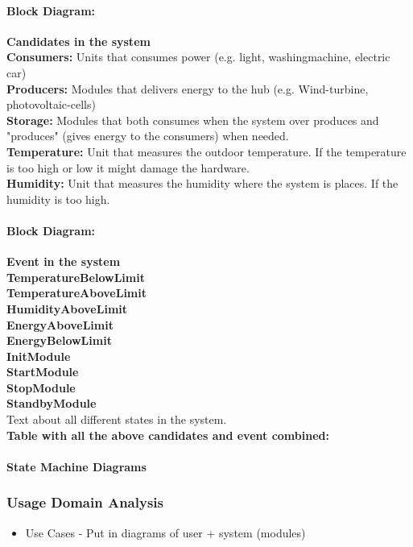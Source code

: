 			\paragraph{Block Diagram:}
				\textbf{Candidates in the system}
				\\\textbf{Consumers:} Units that consumes power (e.g. light, washingmachine, electric car)
				\\\textbf{Producers:} Modules that delivers energy to the hub (e.g. Wind-turbine, photovoltaic-cells)
				\\\textbf{Storage:} Modules that both consumes when the system over produces and "produces" (gives energy to the consumers) when needed. 
				\\\textbf{Temperature:} Unit that measures the outdoor temperature. If the temperature is too high or low it might damage the hardware.
				\\\textbf{Humidity:} Unit that measures the humidity where the system is places. If the humidity is too high.
				\newline
			\paragraph{Block Diagram:}
				\textbf{Event in the system}
				\\\textbf{TemperatureBelowLimit}
				\\\textbf{TemperatureAboveLimit}
				\\\textbf{HumidityAboveLimit}
				\\\textbf{EnergyAboveLimit}
				\\\textbf{EnergyBelowLimit}
				\\\textbf{InitModule}
				\\\textbf{StartModule}
				\\\textbf{StopModule}
				\\\textbf{StandbyModule}
				\\ Text about all different states in the system.
				\\\textbf{Table with all the above candidates and event combined:}
				\newline
			\paragraph{State Machine Diagrams}
			
	\subsubsection{Usage Domain Analysis}
		\begin{itemize}
			\item Use Cases - Put in diagrams of user + system (modules)
		\end{itemize}
